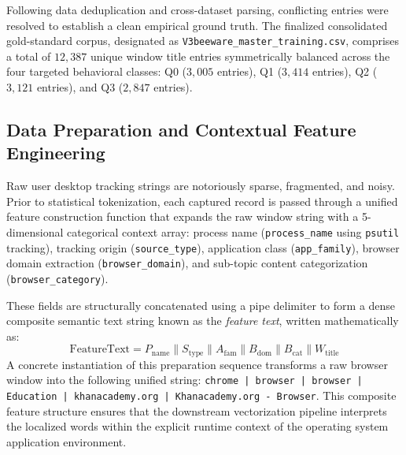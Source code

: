 \documentclass[conference]{IEEEtran}
\begin{document}
Following data deduplication and cross-dataset parsing, conflicting entries were resolved to establish a clean empirical ground truth. The finalized consolidated gold-standard corpus, designated as \texttt{V3beeware\_master\_training.csv}, comprises a total of $12,387$ unique window title entries symmetrically balanced across the four targeted behavioral classes: Q0 ($3,005$ entries), Q1 ($3,414$ entries), Q2 ($3,121$ entries), and Q3 ($2,847$ entries).

\subsection{Data Preparation and Contextual Feature Engineering}
Raw user desktop tracking strings are notoriously sparse, fragmented, and noisy. Prior to statistical tokenization, each captured record is passed through a unified feature construction function that expands the raw window string with a 5-dimensional categorical context array: process name (\texttt{process\_name} using \texttt{psutil} tracking), tracking origin (\texttt{source\_type}), application class (\texttt{app\_family}), browser domain extraction (\texttt{browser\_domain}), and sub-topic content categorization (\texttt{browser\_category}).

These fields are structurally concatenated using a pipe delimiter to form a dense composite semantic text string known as the \emph{feature text}, written mathematically as:
\begin{equation}
\text{FeatureText} = P_{\text{name}} \parallel S_{\text{type}} \parallel A_{\text{fam}} \parallel B_{\text{dom}} \parallel B_{\text{cat}} \parallel W_{\text{title}}
\end{equation}
A concrete instantiation of this preparation sequence transforms a raw browser window into the following unified string: \texttt{chrome | browser | browser | Education | khanacademy.org | Khanacademy.org - Browser}. This composite feature structure ensures that the downstream vectorization pipeline interprets the localized words within the explicit runtime context of the operating system application environment.
\end{document}
